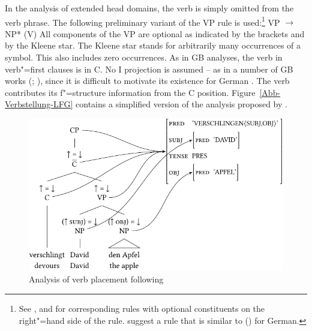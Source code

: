 \noindent
In the analysis of extended head domains, the verb is simply omitted from the verb phrase. The following preliminary variant of the VP rule is used:\footnote{%
See , \citet[]{ZK2002a} and  for corresponding rules
with optional constituents on the right"=hand side of the rule. \citet[]{ZK2002a} suggest a rule that
is similar to () for German.%
}
\ea
\label{Regel-LFG-VP-alles-optional}
VP $\to$ NP* (V)
\z
All components of the VP are optional as indicated by the brackets and by the Kleene star\is{*}. The Kleene star stands for arbitrarily many occurrences of a symbol. This also
includes zero occurrences. As in GB analyses, the verb in
verb"=first clauses is in C. No I projection is assumed -- as in a number of GB works 
(\citealp{Haider93a,Haider95b-u,Haider97a}; \citealp[Section~IV.3]{Sternefeld2006a-u}), since it is difficult to motivate its existence for German
\citep[Section~3.2.2]{Berman2003a}. The verb contributes its f"=structure information from the C position. Figure~\vref{Abb-Verbstellung-LFG} contains a simplified version of the
analysis proposed by \citet[]{Berman2003a}.
 
\begin{figure}
\centerline{%
\includegraphics{Figures/verschlingt-david-den-apfel-lfg-lsp-crop}
}
\caption{\label{Abb-Verbstellung-LFG}Analysis of verb placement following \citet[]{Berman2003a}}
\end{figure}%

